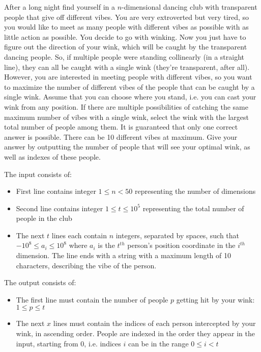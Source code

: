 \problemname{\problemyamlname}


\newcommand{\maxa}{123456789}

After a long night find yourself in a $n$-dimensional dancing club with transparent people that give off different vibes. 
You are very extroverted but very tired, so you would like to meet as many people with different vibes as possible with as little action as possible.
You decide to go with winking. Now you just have to figure out the direction of your wink, which will be caught by the transparent dancing people.
So, if multiple people were standing collinearly (in a straight line), they can all be caught with a single wink (they’re transparent, after all). However, you are interested in meeting people with different vibes, so you want to maximize the number of different vibes of the people that can be caught by a single wink. Assume that you can choose where you stand, i.e. you can cast your wink from any position.
If there are multiple possibilities of catching the same maximum number of vibes with a single wink, select the wink with the largest total number of people among them. It is guaranteed that only one correct answer is possible. There can be 10 different vibes at maximum.
Give your answer by outputting the number of people that will see your optimal wink, as well as indexes of these people.

\begin{Input}
    The input consists of:
    \begin{itemize}
        \item First line contains integer $ 1 \leq n < 50$ representing the number of dimensions
        \item Second line contains integer $ 1 \leq t \leq 10^5 $ representing the total number of people in the club
        \item The next $t$ lines each contain $n$ integers, separated by spaces, such that $ -10^8 \leq a_{i} \leq 10^8 $ where $a_i$ is the $t^{th}$ person’s position coordinate in the $i^{th}$ dimension. The line ends with a string with a maximum length of 10 characters, describing the vibe of the person.
    \end{itemize}
\end{Input}

\begin{Output}
    The output consists of:
    \begin{itemize}
        \item The first line must contain the number of people $p$ getting hit by your wink: $1 \leq p \leq t$
        \item The next $x$ lines must contain the indices of each person intercepted by your wink, in ascending order. People are indexed in the order they appear in the input, starting from 0, i.e. indices $i$ can be in the range $0 \leq i < t$
    \end{itemize}
\end{Output}
